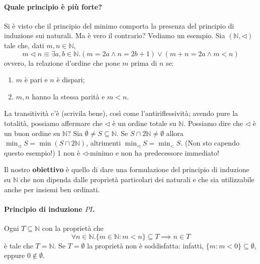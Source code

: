 \documentclass[fontsize = 11 pt, paper=A4, oneside, index=totoc, hyperref]{article}
\theoremstyle{definition}
\theoremstyle{plain}
\newcommand{\N}{\mathbb{N}}
\begin{document}
\paragraph{Quale principio è più forte?} Si è visto che il principio del minimo comporta la presenza del principio di induzione sui naturali. Ma è vero il contrario? Vediamo un esempio. Sia \((\N, \lhd)\) tale che, dati \(m, n \in \N\),
\[
m \lhd n\equiv \exists a,b \in \N. (m = 2a \land n = 2b+1) \lor (m + n = 2a \land m < n)
\]
ovvero, la relazione d'ordine che pone \(m\) prima di \(n\) se:
\begin{enumerate}
  \item \(m\) è pari e \(n\) è dispari;
  \item \(m,n\) hanno la stessa parità e \(m < n\).
\end{enumerate}
La transitività c'è (scrivila bene), così come l'antiriflessività; avendo pure la totalità, possiamo affermare che \(\lhd\) è un ordine totale su \(\N\). Possiamo dire che \(\lhd\) è un buon ordine su \(\N\)?
Sia \(\emptyset \neq S \subseteq \N\). Se \(S \cap 2\N \neq \emptyset\) allora \(\min_{\lhd} S = \min(S\cap2\N)\), altrimenti \(\min_{\lhd} S = \min_{<} S\). (Non sto capendo questo esempio!) 1 non è \(\lhd\)-minimo e non ha predecessore immediato!

Il nostro {\bf obiettivo} è quello di dare una formulazione del principio di induzione su \(\N\) che non dipenda dalle proprietà particolari dei naturali e che sia utilizzabile anche per insiemi ben ordinati.

\paragraph{Principio di induzione \(PI\).} Ogni \(T \subseteq \N\) con la proprietà che
\begin{equation}
\forall n \in \N. \lbrace m \in \N \colon m < n\rbrace \subseteq T \implies n \in T \label{pro1}
\end{equation}
è tale che \(T = \N\). Se \(T = \emptyset\) la proprietà non è soddisfatta: infatti, \(\lbrace m \colon m < 0\rbrace \subseteq \emptyset\), eppure \(0 \notin \emptyset\).
\end{document}
